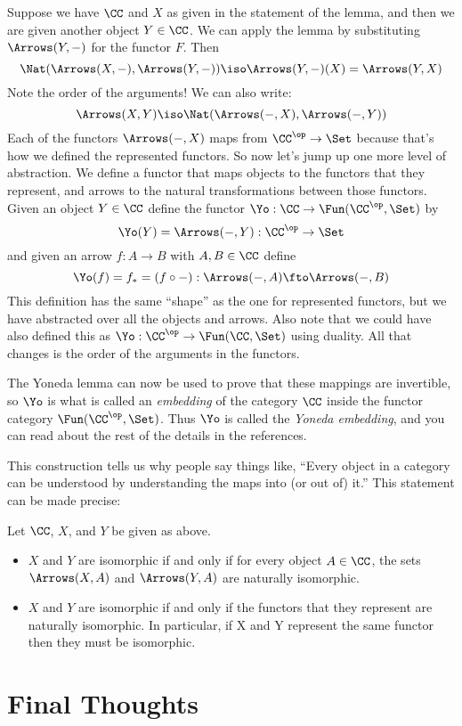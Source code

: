 Suppose we have $\CC$ and $X$ as given in the statement of the lemma, and then we are given another object $Y \in \CC$. 
We can apply the lemma by substituting
$\Arrows(Y,-)$ for the functor $F$. Then
$$
\Nat(\Arrows(X, -),\Arrows(Y,-)) \iso \Arrows(Y,-)(X) = \Arrows(Y,X)
$$
Note the order of the arguments! We can also write:
$$
\Arrows(X,Y) \iso \Nat(\Arrows(-, X),\Arrows(-,Y))
$$
Each of the functors $\Arrows(-, X)$ maps from $\CC^\op \to \Set$ because that's how we
defined the represented functors. So now let's jump up one more level of abstraction. We
define a functor that maps objects to the functors that they represent, and arrows to the
natural transformations between those functors. Given an object $Y\in\CC$ define the functor
$\Yo:\CC \to \Fun(\CC^\op, \Set)$ by
$$
\Yo(Y) = \Arrows(-, Y) : \CC^\op \to \Set
$$
and given an arrow $f: A \to B$ with $A,B \in \CC$ define
$$
\Yo(f) = f_* = (f \circ -) : \Arrows(-,A) \fto \Arrows(-,B)
$$
This definition has the same ``shape'' as the one for represented functors, but we have
abstracted over all the objects and arrows. Also note that we could have also defined this
as $\Yo:\CC^\op \to \Fun(\CC, \Set)$ using duality. All that changes is the 
order of the arguments in the functors.

The Yoneda lemma can now be used to prove that these mappings are invertible, so
$\Yo$ is what is called an {\it embedding} of the category $\CC$ inside the functor
category $\Fun(\CC^\op, \Set)$. Thus $\Yo$ is called the {\it Yoneda embedding}, and you
can read about the rest of the details in the references.

This construction tells us why people say things like, ``Every object in a category can be
understood by understanding the maps into (or out of) it.''  This statement can be made precise:
\begin{cor}
Let $\CC$, $X$, and $Y$ be given as above.
\begin{itemize}
\item $X$  and $Y$ are isomorphic if and only if for every object $A \in \CC$, the sets
$\Arrows(X, A)$ and $\Arrows(Y, A)$ are naturally isomorphic.
\item $X$ and $Y$ are isomorphic if and only if the functors that they represent are
naturally isomorphic. In particular, if X and Y represent the same functor then they must
be isomorphic.
\end{itemize}
\end{cor}

\section{Final Thoughts}

